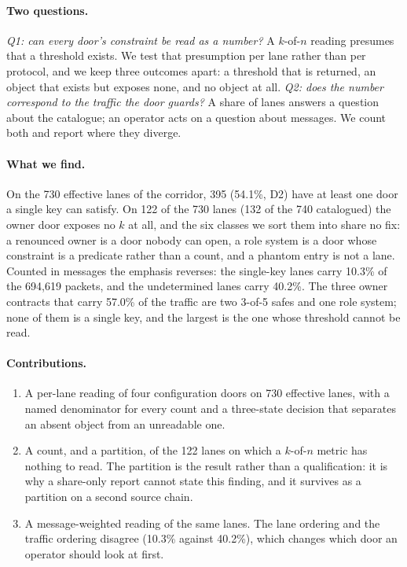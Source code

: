 \documentclass[10pt,a4paper]{article}
\begin{document}
\paragraph{Two questions.}
\emph{Q1: can every door's constraint be read as a number?} A $k$-of-$n$ reading presumes that a threshold
exists. We test that presumption per lane rather than per protocol, and we keep three outcomes apart: a
threshold that is returned, an object that exists but exposes none, and no object at all. \emph{Q2: does the
number correspond to the traffic the door guards?} A share of lanes answers a question about the catalogue;
an operator acts on a question about messages. We count both and report where they diverge.

\paragraph{What we find.}
On the 730 effective lanes of the corridor, 395 (54.1\%, D2) have at least one door a single key can satisfy.
On 122 of the 730 lanes (132 of the 740 catalogued) the owner door exposes no $k$ at all, and the six classes we sort them into share no fix: a renounced
owner is a door nobody can open, a role system is a door whose constraint is a predicate rather than a
count, and a phantom entry is not a lane. Counted in messages the emphasis reverses: the single-key lanes
carry 10.3\% of the 694,619 packets, and the undetermined lanes carry 40.2\%. The three owner contracts that
carry 57.0\% of the traffic are two 3-of-5 safes and one role system; none of them is a single key, and the
largest is the one whose threshold cannot be read.

\paragraph{Contributions.}
\begin{enumerate}[leftmargin=1.2em,itemsep=2pt,topsep=2pt]
\item A per-lane reading of four configuration doors on 730 effective lanes, with a named denominator for
every count and a three-state decision that separates an absent object from an unreadable one.
\item A count, and a partition, of the 122 lanes on which a $k$-of-$n$ metric has nothing to read. The
partition is the result rather than a qualification: it is why a share-only report cannot state this
finding, and it survives as a partition on a second source chain.
\item A message-weighted reading of the same lanes. The lane ordering and the traffic ordering disagree
(10.3\% against 40.2\%), which changes which door an operator should look at first.
\end{enumerate}
\end{document}
